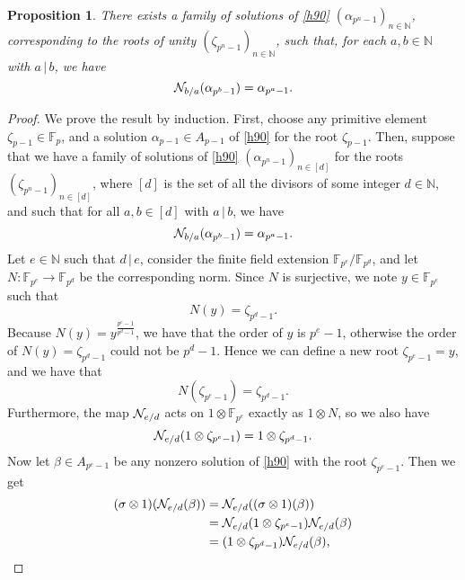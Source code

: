 \documentclass{sig-alternate}
\newtheorem{proposition}{Proposition}
\begin{document}
\begin{proposition}
  \label{prop:complete-alg}
  There exists a family of solutions of \eqref{h90}
  $(\alpha_{p^n-1})_{n\in\mathbb{N}}$, corresponding to the roots of unity
  $(\zeta_{p^n-1})_{n\in\mathbb{N}}$, such that, for each $a,b\in\mathbb{N}$
  with $a\,|\,b$, we have
  \[
    \mathcal{N}_{b/a}(\alpha_{p^b-1})=\alpha_{p^a-1}.
  \]
\end{proposition}
\begin{proof}


  We prove the result by induction. First, choose any primitive element
  $\zeta_{p-1}\in\mathbb{F}_p$, and a solution $\alpha_{p-1}\in
  A_{p-1}$ of \eqref{h90} for the root $\zeta_{p-1}$. Then, suppose that we have
  a family of solutions of \eqref{h90} $(\alpha_{p^n-1})_{n\in \left[ d
  \right]}$ for the roots
  $(\zeta_{p^n-1})_{n\in \left[ d \right]}$, where $\left[ d \right]$ is
  the set of all the divisors of some integer $d\in\mathbb{N}$, and such that for all $a,
  b\in \left[ d \right]$ with $a\,|\,b$, we have
  \[
    \mathcal{N}_{b/a}(\alpha_{p^b-1})=\alpha_{p^a-1}.
  \]
  Let $e\in\mathbb{N}$ such that $d\,|\,e$, consider the
  finite field extension $\mathbb{F}_{p^{e}}/\mathbb{F}_{p^{d}}$, and
  let $N:\mathbb{F}_{p^{e}}\to\mathbb{F}_{p^{d}}$ be the corresponding
  norm. Since $N$ is surjective, we note $y\in\mathbb{F}_{p^{e}}$ such
  that
  \[
    N(y) = \zeta_{p^{d}-1}.
  \]
  Because $N(y)=y^{\frac{p^{e}-1}{p^{d}-1}}$, we have that the order of
  $y$ is $p^{e}-1$, otherwise the order of $N(y)=\zeta_{p^{d}-1}$ could not
  be $p^{d}-1$. Hence we can define a new root $\zeta_{p^{e}-1}=y$, and we
  have that
  \[
    N(\zeta_{p^{e}-1})=\zeta_{p^{d}-1}.
  \]
  Furthermore, the map $\mathcal{N}_{e/d}$ acts on
  $1\otimes\mathbb{F}_{p^{e}}$ exactly as $1\otimes N$, so we also have
  \[
    \mathcal{N}_{e/d}(1\otimes\zeta_{p^{e}-1}) = 1\otimes\zeta_{p^{d}-1}.
  \]
Now let
$\beta\in A_{p^{e}-1}$ be any nonzero solution of \eqref{h90} with the root
$\zeta_{p^{e}-1}$.
Then we get
\begin{align*}
  (\sigma\otimes1)(\N_{e/d}(\beta)) &= \N_{e/d}((\sigma\otimes1)(\beta)) \\
  &= \N_{e/d}(1\otimes\zeta_{p^{e}-1}) \N_{e/d}(\beta) \\
  &= (1\otimes\zeta_{p^{d}-1})\N_{e/d}(\beta),

\end{align*}
\end{proof}
\end{document}

